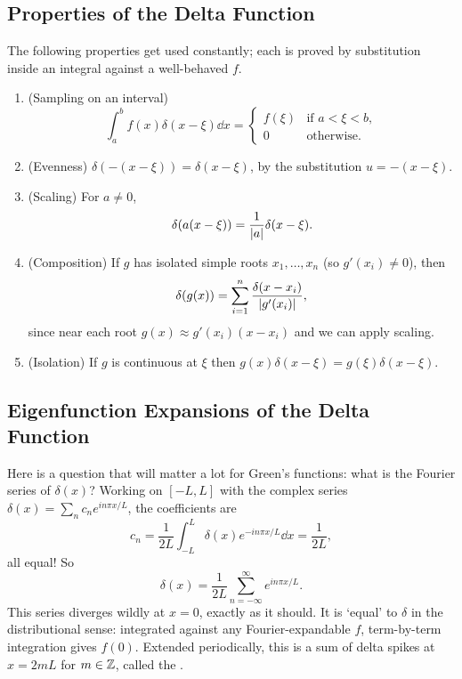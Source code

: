 \documentclass[a4paper]{scrartcl}
\begin{document}
\subsection{Properties of the Delta Function}

The following properties get used constantly; each is proved by substitution inside an integral against a well-behaved $f$.

\begin{enumerate}[label=(\roman*)]
    \item (Sampling on an interval)
    $$
    \int_a^b f(x) \delta(x - \xi) \dd x = \begin{cases}
        f(\xi) &\mbox{if } a < \xi < b, \\
        0 &\mbox{otherwise}.
    \end{cases}
    $$
    \item (Evenness) $\delta(-(x - \xi)) = \delta(x - \xi)$, by the substitution $u = -(x - \xi)$.
    \item (Scaling) For $a \neq 0$,
    $$
    \delta(a(x - \xi)) = \frac{1}{\lvert a\rvert}\delta(x - \xi).
    $$
    \item (Composition) If $g$ has isolated simple roots $x_1, \dots, x_n$ (so $g'(x_i) \neq 0$), then
    $$
    \delta(g(x)) = \sum_{i = 1}^{n} \frac{\delta(x - x_i)}{\lvert g'(x_i)\rvert},
    $$
    since near each root $g(x) \approx g'(x_i)(x - x_i)$ and we can apply scaling.
    \item (Isolation) If $g$ is continuous at $\xi$ then $g(x) \delta(x - \xi) = g(\xi)\delta(x - \xi)$.
\end{enumerate}

\subsection{Eigenfunction Expansions of the Delta Function}

Here is a question that will matter a lot for Green's functions: what is the Fourier series of $\delta(x)$? Working on $[-L, L]$ with the complex series $\delta(x) = \sum_n c_n e^{i n \pi x/L}$, the coefficients are
$$
c_n = \frac{1}{2L}\int_{-L}^{L} \delta(x) e^{-i n \pi x/L} \dd x = \frac{1}{2L},
$$
all equal! So
$$
\delta(x) = \frac{1}{2L} \sum_{n = -\infty}^{\infty} e^{i n \pi x / L}.
$$
This series diverges wildly at $x = 0$, exactly as it should. It is `equal' to $\delta$ in the distributional sense: integrated against any Fourier-expandable $f$, term-by-term integration gives $f(0)$. Extended periodically, this is a sum of delta spikes at $x = 2mL$ for $m \in \mathbb{Z}$, called the .
\end{document}
